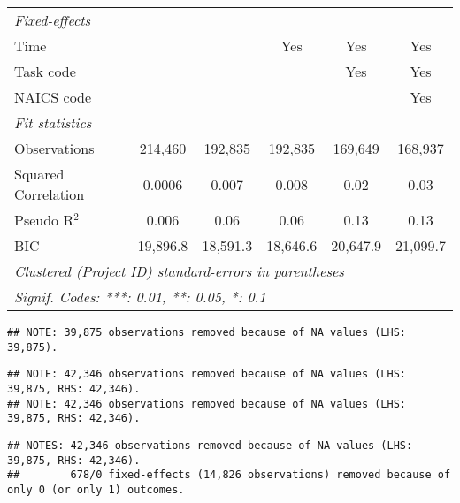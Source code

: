 \documentclass[
]{article}
\begin{document}
\begin{table}[htbp]
\begin{tabular}{lccccc}
      \midrule \emph{Fixed-effects} &   &   &   &   &  \\
      Time                                          &               &                & Yes           & Yes           & Yes\\
      Task code                                     &               &                &               & Yes           & Yes\\
      NAICS code                                    &               &                &               &               & Yes\\
      \midrule \emph{Fit statistics} &   &   &   &   &  \\
      Observations                                  & 214,460       & 192,835        & 192,835       & 169,649       & 168,937\\
      Squared Correlation                           & 0.0006        & 0.007          & 0.008         & 0.02          & 0.03\\
      Pseudo R$^2$                                  & 0.006         & 0.06           & 0.06          & 0.13          & 0.13\\
      BIC                                           & 19,896.8      & 18,591.3       & 18,646.6      & 20,647.9      & 21,099.7\\
      \midrule\midrule\multicolumn{6}{l}{\emph{Clustered (Project ID) standard-errors in parentheses}}\\
      \multicolumn{6}{l}{\emph{Signif. Codes: ***: 0.01, **: 0.05, *: 0.1}}\\
   \end{tabular}
\end{table}

\begin{verbatim}
## NOTE: 39,875 observations removed because of NA values (LHS: 39,875).
\end{verbatim}

\begin{verbatim}
## NOTE: 42,346 observations removed because of NA values (LHS: 39,875, RHS: 42,346).
## NOTE: 42,346 observations removed because of NA values (LHS: 39,875, RHS: 42,346).
\end{verbatim}

\begin{verbatim}
## NOTES: 42,346 observations removed because of NA values (LHS: 39,875, RHS: 42,346).
##        678/0 fixed-effects (14,826 observations) removed because of only 0 (or only 1) outcomes.
\end{verbatim}
\end{document}

